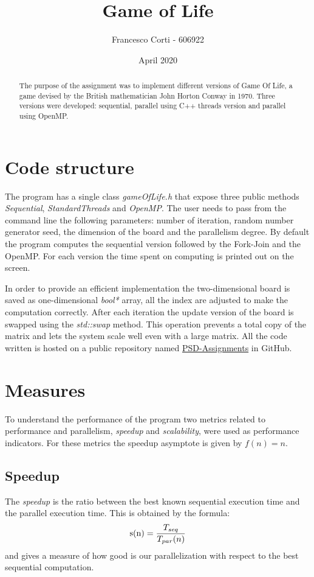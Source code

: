 \documentclass[a4paper,10pt]{article}
\title{Game of Life}
\author{Francesco Corti - 606922}
\date{April 2020}
\begin{document}
		\maketitle
		\begin{abstract}
			The purpose of the assignment was to implement different versions of Game Of Life, a game devised by the British mathematician John Horton Conway in 1970.
			Three versions were developed: sequential, parallel using C++ threads version and parallel using OpenMP. 
		\end{abstract}
\vspace{0.3cm}

\section{Code structure}
The program has a single class \textit{gameOfLife.h} that expose three public methods \textit{Sequential}, \textit{StandardThreads} and \textit{OpenMP}. The user needs to pass from the command line the following parameters: number of iteration, random number generator seed, the dimension of the board and the parallelism degree. By default the program computes the sequential version followed by the Fork-Join and the OpenMP. For each version the time spent on computing is printed out on the screen.

In order to provide an efficient implementation the two-dimensional board is saved as one-dimensional \textit{bool*} array, all the index are adjusted to make the computation correctly. After each iteration the update version of the board is swapped using the \textit{std::swap} method. This operation prevents a total copy of the matrix and lets the system scale well even with a large matrix. All the code written is hosted on a public repository named \href{https://github.com/FraCorti/PSD-Assignments}{PSD-Assignments} in GitHub.

\section{Measures}
To understand the performance of the program two metrics related to performance and parallelism, \textit{speedup} and \textit{scalability}, were used as performance indicators. For these metrics the speedup asymptote is given by $f(n) = n $. 
\subsection{Speedup}
The \textit{speedup} is the ratio between the best known sequential execution time and the parallel execution time. This is obtained by the formula:
\begin{equation}
\textnormal{s(n)} = \frac{T_{seq}}{T_{par}(n)}
\end{equation}
 and gives a measure of how good is our parallelization with respect to the best sequential computation.
\end{document}
